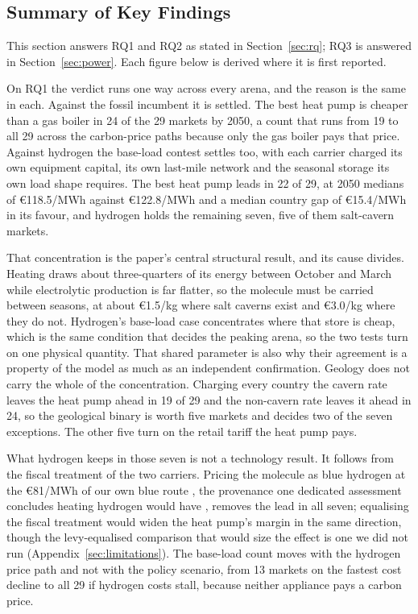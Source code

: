 \label{sec:conclusion}

\subsection{Summary of Key Findings}

This section answers RQ1 and RQ2 as stated in Section~\ref{sec:rq}; RQ3 is answered in
Section~\ref{sec:power}. Each figure below is derived where it is first reported.

On RQ1 the verdict runs one way across every arena, and the reason is the same in each.
Against the fossil incumbent it is settled. The best heat pump is cheaper than a gas
boiler in 24 of the 29 markets by 2050, a count that runs from 19 to all 29 across the
carbon-price paths because only the gas boiler pays that price. Against hydrogen the
base-load contest settles too, with each carrier charged its own equipment capital, its
own last-mile network and the seasonal storage its own load shape requires. The best heat
pump leads in 22 of 29, at 2050 medians of \euro{}118.5/MWh against \euro{}122.8/MWh
and a median country gap of \euro{}15.4/MWh in its favour, and hydrogen holds the
remaining seven, five of
them salt-cavern markets.

That concentration is the paper's central structural result, and its cause divides.
Heating draws about
three-quarters of its energy between October and March while electrolytic production is
far flatter, so the molecule must be carried between seasons, at about \euro{}1.5/kg
where salt caverns exist and \euro{}3.0/kg where they do not. Hydrogen's base-load case
concentrates where that store is cheap, which is the same condition that decides the
peaking arena, so the two tests turn on one physical quantity. That shared parameter is
also why their agreement is a property of the model as much as an independent
confirmation. Geology does not carry the whole of the concentration. Charging every
country the cavern rate leaves the heat pump ahead in 19 of 29 and the non-cavern rate
leaves it ahead in 24, so the geological binary is worth five markets and decides two
of the seven exceptions. The other five turn on the retail tariff the heat pump pays.

What hydrogen keeps in those seven is not a technology result. It follows from the fiscal
treatment of the two carriers. Pricing the molecule as blue hydrogen at the \euro{}81/MWh of our own blue route \citep{IEAGHG2022blue}, the provenance one dedicated assessment concludes heating hydrogen would have \citep{Dickel2024ET29}, removes the lead in all seven; equalising the fiscal treatment
would widen the heat pump's margin in the same direction, though the levy-equalised
comparison that would size the effect is one we did not run
(Appendix~\ref{sec:limitations}). The base-load count moves with the hydrogen price path and not
with the policy scenario, from 13 markets on the fastest cost decline to all 29 if
hydrogen costs stall, because neither appliance pays a carbon price.

